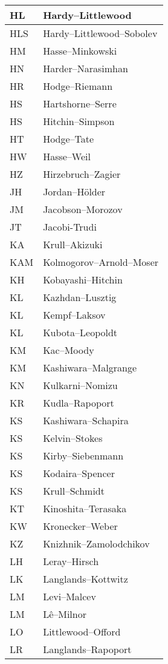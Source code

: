\documentclass{amsart}
\numberwithin{equation}{section}
\theoremstyle{plain}
\numberwithin{equation}{section}
\theoremstyle{remark}
\begin{document}
\begin{multicols}{2}
{\begin{longtable}{l|l}
HL & Hardy--Littlewood\\ \hline
HLS & Hardy--Littlewood--Sobolev\\ \hline
HM & Hasse--Minkowski\\ \hline
HN & Harder--Narasimhan\\ \hline
HR & Hodge--Riemann\\ \hline
HS & Hartshorne--Serre\\ \hline
HS & Hitchin--Simpson\\ \hline
HT & Hodge--Tate\\ \hline
HW & Hasse--Weil\\ \hline
HZ & Hirzebruch--Zagier\\ \hline
JH & Jordan--Hölder\\ \hline
JM & Jacobson--Morozov\\ \hline
JT & Jacobi-Trudi\\ \hline
KA & Krull--Akizuki\\ \hline
KAM & Kolmogorov--Arnold--Moser\\ \hline
KH & Kobayashi--Hitchin\\ \hline
KL & Kazhdan--Lusztig \\ \hline
KL & Kempf--Laksov\\ \hline
KL & Kubota--Leopoldt\\ \hline
KM & Kac--Moody\\ \hline
KM & Kashiwara--Malgrange\\ \hline
KN & Kulkarni--Nomizu\\ \hline
KR & Kudla--Rapoport\\ \hline
KS & Kashiwara--Schapira\\ \hline
KS & Kelvin--Stokes\\ \hline
KS & Kirby--Siebenmann\\ \hline
KS & Kodaira--Spencer\\ \hline
KS & Krull--Schmidt\\ \hline
KT & Kinoshita--Terasaka\\ \hline
KW & Kronecker--Weber\\ \hline
KZ & Knizhnik--Zamolodchikov\\ \hline
LH & Leray--Hirsch\\ \hline
LK & Langlands--Kottwitz\\ \hline
LM & Levi--Malcev\\ \hline
LM & Lê--Milnor\\ \hline
LO & Littlewood--Offord\\ \hline
LR & Langlands--Rapoport\\ \hline

\end{longtable}}
\end{multicols}
\end{document}
